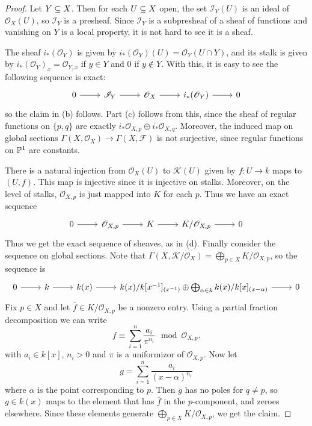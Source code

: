 \documentclass[11pt]{book}
\theoremstyle{definition}
\begin{document}
\begin{proof}
Let $Y\sub X$. Then for each $U\sub X$ open, the set $\mathscr{I}_Y(U)$ is an ideal of $\mathscr{O}_X(U)$, so $\mathscr{I}_Y$ is a presheaf. Since $\mathscr{I}_Y$ is a subpresheaf of a sheaf of functions and vanishing on $Y$ is a local property, it is not hard to see it is a sheaf.\par
The sheaf $i_*(\mathscr{O}_Y)$ is given by $i_*(\mathscr{O}_Y)(U)=\mathscr{O}_Y(U\cap Y)$, and its stalk is given by $i_*(\mathscr{O}_Y)_x=\mathscr{O}_{Y,x}$ if $y\in Y$ and $0$ if $y\notin Y$. With this, it is easy to see the following sequence is exact:
\[\begin{tikzcd}
0\ar[r]&\mathscr{I}_Y\ar[r]&\mathscr{O}_X\ar[r]&i_*(\mathscr{O}_Y)\ar[r]&0
\end{tikzcd}\]
so the claim in (b) follows. Part (c) follows from this, since the sheaf of regular functions on $\{p,q\}$ are exactly $i_*\mathscr{O}_{X,p}\oplus i_*\mathscr{O}_{X,q}$. Moreover, the induced map on global sections $\Gamma(X,\mathscr{O}_X)\to\Gamma(X,\mathscr{F})$ is not surjective, since regular functions on $\P^1$ are constants.\par
There is a natural injection from $\mathscr{O}_X(U)$ to $\mathscr{K}(U)$ given by $f:U\to k$ maps to $(U,f)$. This map is injective since it is injective on stalks. Moreover, on the level of stalks, $\mathscr{O}_{X,p}$ is just mapped into $K$ for each $p$. Thus we have an exact sequence
\[\begin{tikzcd}
0\ar[r]&\mathscr{O}_{X,p}\ar[r]&K\ar[r]&K/\mathscr{O}_{X,p}\ar[r]&0
\end{tikzcd}\]
Thus we get the exact sequence of sheaves, as in (d). Finally consider the sequence on global sections. Note that $\Gamma(X,\mathscr{K}/\mathscr{O}_X)=\bigoplus_{p\in X}K/\mathscr{O}_{X,p}$, so the sequence is
\[\begin{tikzcd}
0\ar[r]&k\ar[r]&k(x)\ar[r]&k(x)/k[x^{-1}]_{(x^{-1})}\oplus\bigoplus_{\alpha\in k}k(x)/k[x]_{(x-\alpha)}\ar[r]&0
\end{tikzcd}\]
Fix $p\in X$ and let $\bar{f}\in K/\mathscr{O}_{X,p}$ be a nonzero entry. Using a partial fraction decomposition we can write
\[f\equiv\sum_{i=1}^{n}\frac{a_i}{\pi^{n_i}}\mod\mathscr{O}_{X,p}.\]
with $a_i\in k[x]$, $n_i>0$ and $\pi$ is a uniformizor of $\mathscr{O}_{X,p}$. Now let
\[g=\sum_{i=1}^{n}\frac{a_i}{(x-\alpha)^{n_i}}\]
where $\alpha$ is the point corresponding to $p$. Then $g$ has no poles for $q\neq p$, so $g\in k(x)$ maps to the element that has $\bar{f}$ in the $p$-component, and zeroes elsewhere. Since these elements generate $\bigoplus_{p\in X}K/\mathscr{O}_{X,p}$, we get the claim.
\end{proof}
\end{document}

